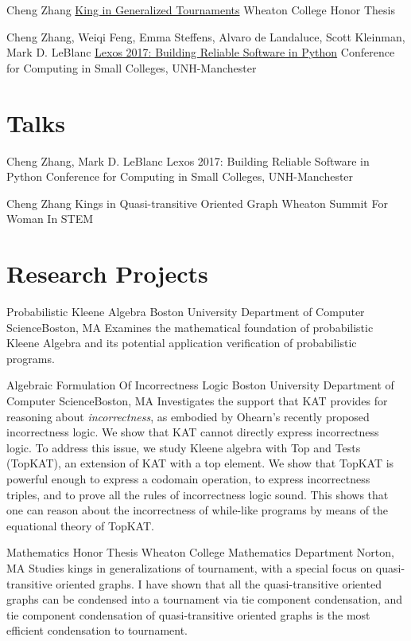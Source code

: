 \documentclass[11pt,roman]{moderncv}        %
\begin{document}
{Cheng Zhang}
{\href{http://hdl.handle.net/11040/24570}{King in Generalized Tournaments}}
{Wheaton College Honor Thesis}
{}{}

{Cheng Zhang, Weiqi Feng, Emma Steffens, Alvaro de Landaluce, Scott Kleinman, Mark D. LeBlanc}
{\href{https://dl.acm.org/doi/10.5555/3205191.3205205}{Lexos 2017: Building Reliable Software in Python}}
{Conference for Computing in Small Colleges, UNH-Manchester}
{}{}


\section{Talks}

{Cheng Zhang, Mark D. LeBlanc}
{Lexos 2017: Building Reliable Software in Python}
{Conference for Computing in Small Colleges, UNH-Manchester}
{}{}

{Cheng Zhang}
{Kings in Quasi-transitive Oriented Graph}
{Wheaton Summit For Woman In STEM}
{}{}


\section{Research Projects}

{Probabilistic Kleene Algebra}
{Boston University Department of Computer Science}{Boston, MA}{}
{Examines the mathematical foundation of probabilistic Kleene Algebra 
and its potential application verification of probabilistic programs.}

{Algebraic Formulation Of Incorrectness Logic}
{Boston University Department of Computer Science}{Boston, MA}{}
{Investigates the support that KAT provides for reasoning about \emph{incorrectness}, 
as embodied by Ohearn's recently proposed incorrectness logic. 
We show that KAT cannot directly express incorrectness logic. 
To address this issue, we study Kleene algebra with Top and Tests (TopKAT), 
an extension of KAT with a top element. 
We show that TopKAT is powerful enough to express a codomain operation, 
to express incorrectness triples, 
and to prove all the rules of incorrectness logic sound. 
This shows that one can reason about the incorrectness of while-like programs 
by means of the equational theory of TopKAT\@. }

{Mathematics Honor Thesis}
{Wheaton College Mathematics Department}
{Norton, MA}{}
{Studies kings in generalizations of tournament,
with a special focus on quasi-transitive oriented graphs.
I have shown that all the quasi-transitive oriented graphs
can be condensed into a tournament via tie component condensation, 
and tie component condensation of quasi-transitive 
oriented graphs is the most efficient condensation to tournament.
}
\end{document}
